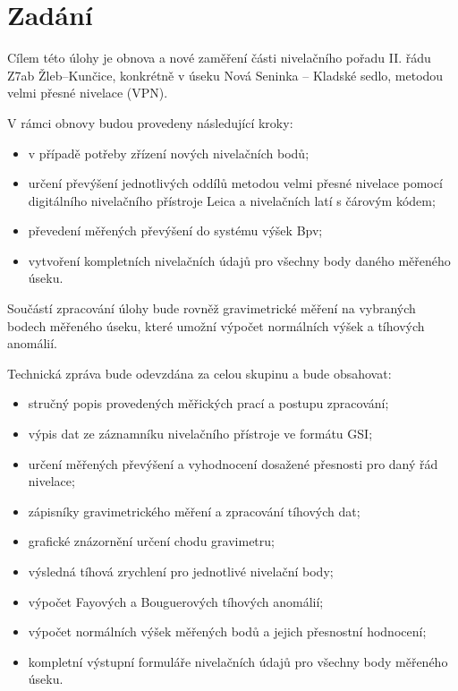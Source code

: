 \section{Zadání}

Cílem této úlohy je obnova a nové zaměření části nivelačního pořadu II. řádu Z7ab Žleb–Kunčice, konkrétně v úseku Nová Seninka – Kladské sedlo, metodou velmi přesné nivelace (VPN). 

V rámci obnovy budou provedeny následující kroky:

\begin{itemize}
    \item v případě potřeby zřízení nových nivelačních bodů;
    \item určení převýšení jednotlivých oddílů metodou velmi přesné nivelace pomocí digitálního nivelačního přístroje Leica a nivelačních latí s čárovým kódem;
    \item převedení měřených převýšení do systému výšek Bpv;
    \item vytvoření kompletních nivelačních údajů pro všechny body daného měřeného úseku.
\end{itemize}

Součástí zpracování úlohy bude rovněž gravimetrické měření na vybraných bodech měřeného úseku, které umožní výpočet normálních výšek a tíhových anomálií.

Technická zpráva bude odevzdána za celou skupinu a bude obsahovat:

\begin{itemize}
    \item stručný popis provedených měřických prací a postupu zpracování;
    \item výpis dat ze záznamníku nivelačního přístroje ve formátu GSI;
    \item určení měřených převýšení a vyhodnocení dosažené přesnosti pro daný řád nivelace;
    \item zápisníky gravimetrického měření a zpracování tíhových dat;
    \item grafické znázornění určení chodu gravimetru;
    \item výsledná tíhová zrychlení pro jednotlivé nivelační body;
    \item výpočet Fayových a Bouguerových tíhových anomálií;
    \item výpočet normálních výšek měřených bodů a jejich přesnostní hodnocení;
    \item kompletní výstupní formuláře nivelačních údajů pro všechny body měřeného úseku.
\end{itemize}


